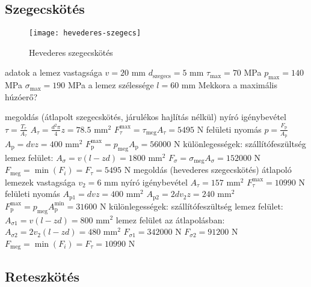 \subsection{Szegecskötés}%

\begin{wrapfigure}{R}{.28\textwidth}
	\centering
	\vspace{-3cm}
	\centering
	\texttt{[image: hevederes-szegecs]}
	\caption{Hevederes szegecskötés}
\end{wrapfigure}
\parbox{.7\textwidth}{
\begin{outline}
	\1 adatok
		\2 a lemez vastagsága $v =20$ mm
		\2 $d_\text{szegecs} = 5$ mm
		\2 $\tau_\text{max} = 70$ MPa
		\2 $p_\text{max} = 140$ MPa
		\2 $\sigma_\text{max} = 190$ MPa
		\2 a lemez szélessége $l=60$ mm
		\2 Mekkora a maximális húzóerő?
\end{outline}}
\begin{outline}
	\1 megoldás (átlapolt szegecskötés, járulékos hajlítás nélkül)
		\2 nyíró igénybevétel
			\3 $\tau = \frac{T_\tau}{A_\tau}$
			\3 $A_\tau = \frac{d^2\pi}{4}z = 78.5\text{ mm}^2$
			\3 $F_\tau^\text{max} = \tau_\text{meg}A_\tau = 5495$ N
		\2 felületi nyomás
			\3 $p=\frac{F_\text{p}}{A_\text{p}}$
			\3 $A_\text{p} = dvz = 400\text{ mm}^2$
			\3 $F_\text{p}^\text{max} = p_\text{meg}A_\text{p} = 56000$ N
		\2 különlegességek: szállítófeszültség
			\3 lemez felület: $A_\sigma = v(l-zd)=1800\text{ mm}^2$
			\3 $F_\sigma=\sigma_\text{meg}A_\sigma=152000$ N
		\2 $F_\text{meg} = \min(F_i) = F_\tau=5495$ N
	\1 megoldás (hevederes szegecskötés)
		\2 átlapoló lemezek vastagsága $v_2 = 6$ mm
		\2 nyíró igénybevétel
			\3 $A_\tau = 157\text{ mm}^2$
			\3 $F_\tau^\text{max} = 10990$ N
		\2 felületi nyomás
			\3 $A_{\text{p}1} = dvz = 400\text{ mm}^2$
			\3 $A_{\text{p}2} = 2dv_2z = 240\text{ mm}^2$
			\3 $F_\text{p}^\text{max} = p_\text{meg}A_\text{p}^\text{min} = 31600$ N
		\2 különlegességek: szállítófeszültség
			\3 lemez felület: $A_{\sigma1} = v(l-zd)=800\text{ mm}^2$
			\3 lemez felület az átlapolásban: $A_{\sigma2} = 2v_2(l-zd)=480\text{ mm}^2$
			\3 $F_{\sigma1}=342000$ N
			\3 $F_{\sigma2}=91200$ N
		\2 $F_\text{meg} = \min(F_i) = F_\tau=10990$ N
\end{outline}

\subsection{Reteszkötés}%

